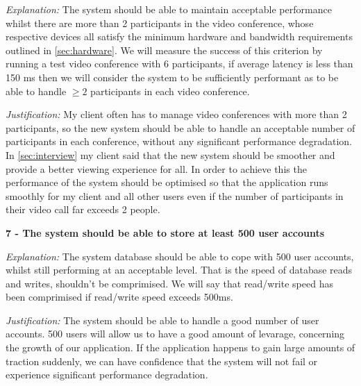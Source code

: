 \textit{Explanation:}
The system should be able to maintain acceptable performance
whilst there are more than 2 participants in the video 
conference, whose respective devices all satisfy the minimum
hardware and bandwidth requirements outlined in 
\ref{sec:hardware}. We will measure the success of this 
criterion by running a test video conference with 6 
participants, if average latency is less than 150 ms then we
will consider the system to be sufficiently performant as to 
be able to handle $\geq 2$ participants in each video
conference.
\vspace{0.1cm}

\textit{Justification:}
My client often has to manage video conferences with more than
2 participants, so the new system should be able to handle an 
acceptable number of participants in each conference, without
any significant performance degradation. In
\ref{sec:interview} my client said that the new system 
should be smoother and provide a better viewing experience 
for all. In order to achieve this the performance of the 
system should be optimised so that the application runs 
smoothly for my client and all other users even if the
number of participants in their video call far exceeds 2 
people.

\vspace{0.2cm}

\textsf{\bfseries 7 - The system should be able to store at 
least 500 user accounts}

\vspace{0.1cm}

\textit{Explanation:}
The system database should be able to cope with 500 user 
accounts, whilst still performing at an acceptable level.
That is the speed of database reads and writes, shouldn't
be comprimised. We will say that read/write speed has been 
comprimised if read/write speed exceeds 500ms.
\vspace{0.1cm}

\textit{Justification:}
The system should be able to handle a good number of user 
accounts. 500 users will allow us to have a good amount of 
levarage, concerning the growth of our application. If the 
application happens to gain large amounts of traction
suddenly, we can have confidence that the system will not 
fail or experience significant performance degradation.
